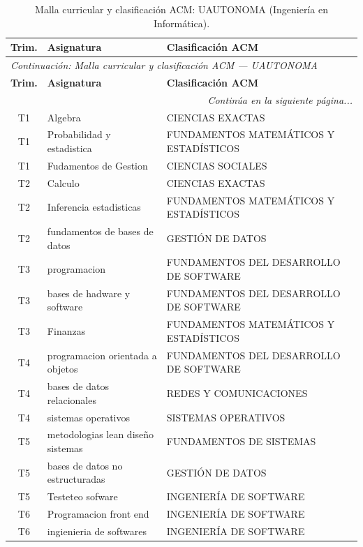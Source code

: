\documentclass[11pt,a4paper]{article}
\begin{document}
\begin{small}
\begin{longtable}{c >{\raggedright\arraybackslash}p{8.5cm} >{\raggedright\arraybackslash}p{5.5cm}}
\caption{Malla curricular y clasificación ACM: UAUTONOMA (Ingeniería en Informática).} \label{tab:UA16} \\
\toprule
\textbf{Trim.} & \textbf{Asignatura} & \textbf{Clasificación ACM} \\
\midrule
\endfirsthead
\multicolumn{3}{l}{\small\textit{Continuación: Malla curricular y clasificación ACM --- UAUTONOMA}} \\[3pt]
\toprule
\textbf{Trim.} & \textbf{Asignatura} & \textbf{Clasificación ACM} \\
\midrule
\endhead
\midrule
\multicolumn{3}{r}{\small\textit{Continúa en la siguiente página...}} \\
\endfoot
\bottomrule
\endlastfoot
T1 & Algebra & CIENCIAS EXACTAS \\
T1 & Probabilidad y estadistica & FUNDAMENTOS MATEMÁTICOS Y ESTADÍSTICOS \\
T1 & Fudamentos de Gestion & CIENCIAS SOCIALES \\
T2 & Calculo & CIENCIAS EXACTAS \\
T2 & Inferencia estadisticas & FUNDAMENTOS MATEMÁTICOS Y ESTADÍSTICOS \\
T2 & fundamentos de bases de datos & GESTIÓN DE DATOS \\
T3 & programacion & FUNDAMENTOS DEL DESARROLLO DE SOFTWARE \\
T3 & bases de hadware y software & FUNDAMENTOS DEL DESARROLLO DE SOFTWARE \\
T3 & Finanzas & FUNDAMENTOS MATEMÁTICOS Y ESTADÍSTICOS \\
T4 & programacion orientada a objetos & FUNDAMENTOS DEL DESARROLLO DE SOFTWARE \\
T4 & bases de datos relacionales & REDES Y COMUNICACIONES \\
T4 & sistemas operativos & SISTEMAS OPERATIVOS \\
T5 & metodologias lean diseño sistemas & FUNDAMENTOS DE SISTEMAS \\
T5 & bases de datos no estructuradas & GESTIÓN DE DATOS \\
T5 & Testeteo sofware & INGENIERÍA DE SOFTWARE \\
T6 & Programacion front end & INGENIERÍA DE SOFTWARE \\
T6 & ingienieria de softwares & INGENIERÍA DE SOFTWARE \\

\end{longtable}
\end{small}
\end{document}
